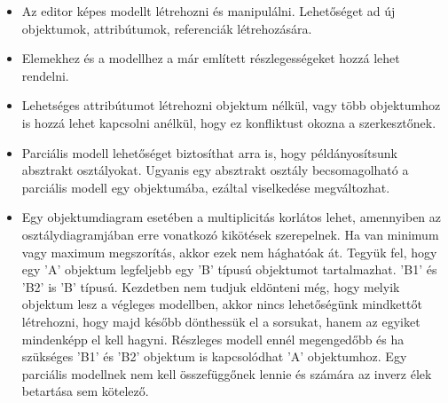 \begin{itemize}  
	\item Az editor képes modellt létrehozni és manipulálni. Lehetőséget ad új objektumok, attribútumok, referenciák létrehozására.
	\item Elemekhez és a modellhez a már említett részlegességeket hozzá lehet rendelni.
	\item Lehetséges attribútumot létrehozni objektum nélkül, vagy több objektumhoz is hozzá lehet kapcsolni anélkül, hogy ez konfliktust okozna a szerkesztőnek.
	\item Parciális modell lehetőséget biztosíthat arra is, hogy példányosítsunk absztrakt osztályokat. Ugyanis egy absztrakt osztály becsomagolható a parciális modell egy objektumába, ezáltal viselkedése megváltozhat.
	\item Egy objektumdiagram esetében a multiplicitás korlátos lehet, amennyiben az osztálydiagramjában erre vonatkozó kikötések szerepelnek. Ha van minimum vagy maximum megszorítás, akkor ezek nem hághatóak át. Tegyük fel, hogy egy 'A' objektum legfeljebb egy 'B' típusú objektumot tartalmazhat. 'B1' és 'B2' is 'B' típusú. Kezdetben nem tudjuk eldönteni még, hogy melyik objektum lesz a végleges modellben, akkor nincs lehetőségünk mindkettőt létrehozni, hogy majd később dönthessük el a sorsukat, hanem az egyiket mindenképp el kell hagyni. Részleges modell ennél megengedőbb és ha szükséges 'B1' és 'B2' objektum is kapcsolódhat 'A' objektumhoz. Egy parciális modellnek nem kell összefüggőnek lennie és számára az inverz élek betartása sem kötelező.	  	
\end{itemize}

